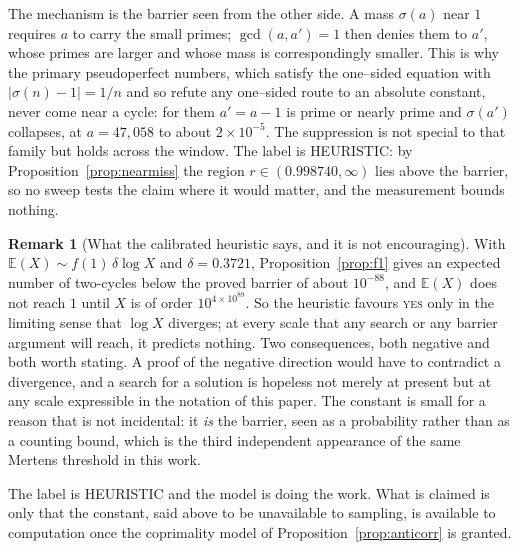 \documentclass[11pt]{article}
\theoremstyle{definition}
\newtheorem{remark}[theorem]{Remark}
\begin{document}
The mechanism is the barrier seen from the other side. A mass $\sigma(a)$ near $1$ requires $a$ to
carry the small primes; $\gcd(a,a')=1$ then denies them to $a'$, whose primes are larger and whose
mass is correspondingly smaller. This is why the primary pseudoperfect numbers, which satisfy the
one--sided equation with $|\sigma(n)-1|=1/n$ and so refute any one--sided route to an absolute
constant, never come near a cycle: for them $a'=a-1$ is prime or nearly prime and $\sigma(a')$
collapses, at $a=47{,}058$ to about $2\times10^{-5}$. The suppression is not special to that family
but holds across the window. The label is \textup{HEURISTIC}: by Proposition~\ref{prop:nearmiss} the
region $r\in(0.998740,\infty)$ lies above the barrier, so no sweep tests the claim where it would
matter, and the measurement bounds nothing.

\begin{remark}[What the calibrated heuristic says, and it is not encouraging]\label{rem:calibrated}
With $\mathbb{E}(X)\sim f(1)\,\delta\log X$ and $\delta=0.3721$, Proposition~\ref{prop:f1} gives an
expected number of two-cycles below the proved barrier of about $10^{-88}$, and $\mathbb{E}(X)$ does
not reach $1$ until $X$ is of order $10^{4\times10^{89}}$. So the heuristic favours \textsc{yes} only
in the limiting sense that $\log X$ diverges; at every scale that any search or any barrier argument
will reach, it predicts nothing. Two consequences, both negative and both worth stating. A proof of
the negative direction would have to contradict a divergence, and a search for a solution is
hopeless not merely at present but at any scale expressible in the notation of this paper. The
constant is small for a reason that is not incidental: it \emph{is} the barrier, seen as a
probability rather than as a counting bound, which is the third independent appearance of the same
Mertens threshold in this work.

The label is \textup{HEURISTIC} and the model is doing the work. What is claimed is only that the
constant, said above to be unavailable to sampling, is available to computation once the coprimality
model of Proposition~\ref{prop:anticorr} is granted.
\end{remark}
\end{document}
